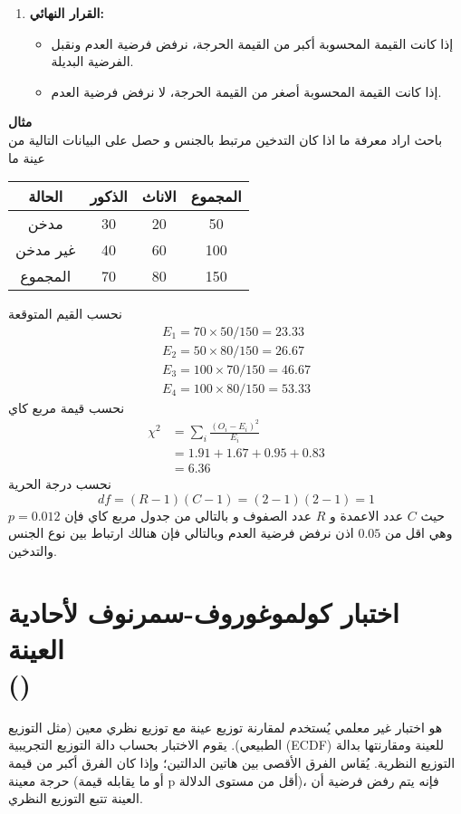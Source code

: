 \begin{enumerate}
	\item \textbf{القرار النهائي:}
	\begin{itemize}
		\item إذا كانت القيمة المحسوبة أكبر من القيمة الحرجة، نرفض فرضية العدم ونقبل الفرضية البديلة.
		\item إذا كانت القيمة المحسوبة أصغر من القيمة الحرجة، لا نرفض فرضية العدم.
	\end{itemize}
\end{enumerate}


\noindent
\textbf{مثال}\\
باحث اراد معرفة ما اذا كان التدخين مرتبط بالجنس و حصل على البيانات التالية من عينة ما\\
\begin{table}[H]
	\centering
	\begin{tabular}{|c|c|c|c|}
		\hline
		الحالة & الذكور & الاناث & المجموع\\
		\hline
		مدخن & 30 & 20 & 50\\
		\hline
		غير مدخن & 40 & 60 & 100\\
		\hline
		المجموع & 70 & 80 & 150\\
		\hline
	\end{tabular}
\end{table}
نحسب القيم المتوقعة
\begin{align*}
	E_1 = 70\times 50 / 150 = 23.33\\
	E_2 = 50\times80/ 150 = 26.67\\
	E_3 = 100\times 70/ 150 = 46.67\\
	E_4 = 100\times 80 /150 = 53.33
\end{align*}
نحسب قيمة مربع كاي 
\begin{align*}
	\chi^2 & = \sum_i \frac{(O_i - E_i)^2}{E_i} \\
	&= 1.91 + 1.67 + 0.95 + 0.83\\
	&= 6.36
\end{align*}
نحسب درجة الحرية
\[
df = (R-1)(C-1) = (2-1)(2-1) = 1
\]
حيث $C$ عدد الاعمدة و $R$ عدد الصفوف و بالتالي من جدول مربع كاي فإن $p = 0.012$ وهي اقل من $0.05$ اذن نرفض فرضية العدم وبالتالي فإن هنالك ارتباط بين نوع الجنس والتدخين. 

\section{اختبار كولموغوروف-سمرنوف لأحادية العينة \\()}
هو اختبار غير معلمي يُستخدم لمقارنة توزيع عينة مع توزيع نظري معين (مثل التوزيع الطبيعي). يقوم الاختبار بحساب دالة التوزيع التجريبية (ECDF) للعينة ومقارنتها بدالة التوزيع النظرية. يُقاس الفرق الأقصى بين هاتين الدالتين؛ وإذا كان الفرق أكبر من قيمة حرجة معينة (أو ما يقابله قيمة p أقل من مستوى الدلالة)، فإنه يتم رفض فرضية أن العينة تتبع التوزيع النظري.

